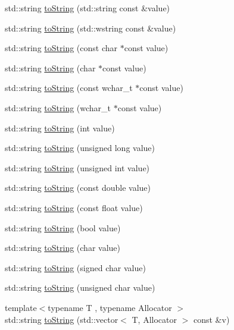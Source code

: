 \begin{DoxyCompactItemize}
std\+::string \hyperlink{namespace_catch_ad6e969257437cf007b8b5017b22e570c}{to\+String} (std\+::string const \&value)
\item 
std\+::string \hyperlink{namespace_catch_af9fc40701e3a7d0790866e7cf8c0279f}{to\+String} (std\+::wstring const \&value)
\item 
std\+::string \hyperlink{namespace_catch_ace2e2fe33b196bc8278f605dcb72e38d}{to\+String} (const char $\ast$const value)
\item 
std\+::string \hyperlink{namespace_catch_ae6c2bc95517444d8df8199bd3f61609b}{to\+String} (char $\ast$const value)
\item 
std\+::string \hyperlink{namespace_catch_afa173b4639c682c9d8c20fae0939693c}{to\+String} (const wchar\+\_\+t $\ast$const value)
\item 
std\+::string \hyperlink{namespace_catch_aa39121565abe9f30fce5d48e4e094768}{to\+String} (wchar\+\_\+t $\ast$const value)
\item 
std\+::string \hyperlink{namespace_catch_acee54d0580385e4347bc42a7d22bc893}{to\+String} (int value)
\item 
std\+::string \hyperlink{namespace_catch_aba1d78bce62f8c73cbfc2a14225356ea}{to\+String} (unsigned long value)
\item 
std\+::string \hyperlink{namespace_catch_a6fd78030f740c1c3bdc60efdfd5fc85d}{to\+String} (unsigned int value)
\item 
std\+::string \hyperlink{namespace_catch_a3eb4356d09b7ef3286f6c1c1efe8cabf}{to\+String} (const double value)
\item 
std\+::string \hyperlink{namespace_catch_a80b6411e2cba89e58aa8feb960d045d5}{to\+String} (const float value)
\item 
std\+::string \hyperlink{namespace_catch_a5d3bdb2ec0e6f415e2a1a0e4914d7d3a}{to\+String} (bool value)
\item 
std\+::string \hyperlink{namespace_catch_a25a0a78cbb62ea08b5d49e443051c387}{to\+String} (char value)
\item 
std\+::string \hyperlink{namespace_catch_a0a5d9d0965d0d2a0663773732283713e}{to\+String} (signed char value)
\item 
std\+::string \hyperlink{namespace_catch_a5d83eaeb68579a556c86cc05f7a7765f}{to\+String} (unsigned char value)
\item 
{\footnotesize template$<$typename T , typename Allocator $>$ }\\std\+::string \hyperlink{namespace_catch_a2899237fef39daaae9a22e7846c0a9bf}{to\+String} (std\+::vector$<$ T, Allocator $>$ const \&v)

\end{DoxyCompactItemize}
